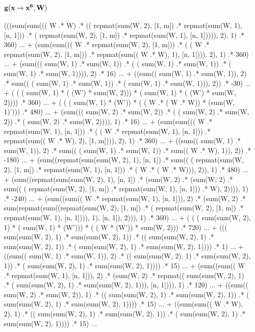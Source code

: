 \documentclass{article}
\begin{document}
\subsection{{$\bf g(x \rightarrow x^6, W)$}}
(((sum(sum((( W .* W)  .* (( repmat(sum(W, 2), [1, m]) .* repmat(sum(W, 1), [n, 1]))  .* ( repmat(sum(W, 2), [1, m]) .* repmat(sum(W, 1), [n, 1])))), 2), 1)  .* 360) ...
  + (sum(sum((( W .* repmat(sum(W, 2), [1, m]))  .* ( ( W .* repmat(sum(W, 2), [1, m])) .* repmat(sum(( W .* W), 1), [n, 1]))), 2), 1)  .* 360) ...
  + (sum((( sum(W, 1) .* sum(W, 1))  .* ( ( sum(W, 1) .* sum(W, 1)) .* ( sum(W, 1) .* sum(W, 1)))), 2)  .* 16) ...
  + ((sum(( sum(W, 1) .* sum(W, 1)), 2)  .* sum(( ( sum(W, 1) .* sum(W, 1)) .* ( sum(W, 1) .* sum(W, 1))), 2))  .* -30) ...
  + ( ( ( sum(W, 1) * ( (W') * sum(W, 2))) * ( sum(W, 1) * ( (W') * sum(W, 2)))) .* 360) ...
  + ( ( ( sum(W, 1) * (W')) * ( ( W .* ( W .* W)) * (sum(W, 1)'))) .* 480) ...
  + (sum((( sum(W, 2) .* sum(W, 2))  .* ( ( sum(W, 2) .* sum(W, 2)) .* ( sum(W, 2) .* sum(W, 2)))), 1)  .* 16) ...
  + (sum(sum((( W .* repmat(sum(W, 1), [n, 1]))  .* ( ( W .* repmat(sum(W, 1), [n, 1])) .* repmat(sum(( W .* W), 2), [1, m]))), 2), 1)  .* 360) ...
  + ((sum(( sum(W, 1) .* sum(W, 1)), 2)  .* sum(( ( sum(W, 1) .* sum(W, 1)) .* sum(( W .* W), 1)), 2))  .* -180) ...
  + (sum((repmat(sum(sum(W, 2), 1), [n, 1])  .* sum(( ( repmat(sum(W, 2), [1, m]) .* repmat(sum(W, 1), [n, 1])) .* ( W .* ( W .* W))), 2)), 1)  .* 480) ...
  + (sum((repmat(sum(sum(W, 2), 1), [n, 1])  .* (sum(W, 2)  .* (sum(W, 2)  .* sum(( ( repmat(sum(W, 2), [1, m]) .* repmat(sum(W, 1), [n, 1])) .* W), 2)))), 1)  .* -240) ...
  + (sum((sum(( W .* repmat(sum(W, 1), [n, 1])), 2)  .* (sum(W, 2)  .* sum(repmat(sum((repmat(sum(W, 2), [1, m])  .* ( repmat(sum(W, 2), [1, m]) .* repmat(sum(W, 1), [n, 1]))), 1), [n, 1]), 2))), 1)  .* 360) ...
  + ( ( ( sum(sum(W, 2), 1) * ( sum(W, 1) * (W'))) * ( ( W * (W')) * sum(W, 2))) .* 720) ...
  + ((( sum(sum(W, 2), 1) .* sum(sum(W, 2), 1))  .* (( sum(sum(W, 2), 1) .* sum(sum(W, 2), 1))  .* ( sum(sum(W, 2), 1) .* sum(sum(W, 2), 1))))  .* 1) ...
  + ((sum(( sum(W, 1) .* sum(W, 1)), 2)  .* (( sum(sum(W, 2), 1) .* sum(sum(W, 2), 1))  .* ( sum(sum(W, 2), 1) .* sum(sum(W, 2), 1))))  .* 15) ...
  + (sum((sum(( W .* repmat(sum(W, 1), [n, 1])), 2)  .* (sum(W, 2)  .* repmat(( sum(sum(W, 2), 1) .* ( sum(sum(W, 2), 1) .* sum(sum(W, 2), 1))), [n, 1]))), 1)  .* 120) ...
  + ((sum(( sum(W, 2) .* sum(W, 2)), 1)  .* (( sum(sum(W, 2), 1) .* sum(sum(W, 2), 1))  .* ( sum(sum(W, 2), 1) .* sum(sum(W, 2), 1))))  .* 15) ...
  + ((sum(sum(( W .* W), 2), 1)  .* (( sum(sum(W, 2), 1) .* sum(sum(W, 2), 1))  .* ( sum(sum(W, 2), 1) .* sum(sum(W, 2), 1))))  .* 15) ...
\end{document}
